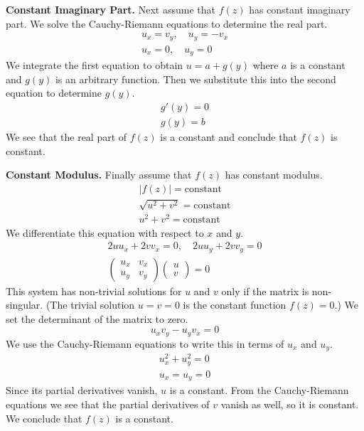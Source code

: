 {\begin{Solution}
  \textbf{Constant Imaginary Part.}
  Next assume that $f(z)$ has constant imaginary part.  We solve the 
  Cauchy-Riemann equations to determine the real part.
  \begin{gather*}
    u_x = v_y, \quad u_y = - v_x
    \\
    u_x = 0, \quad u_y = 0
  \end{gather*}
  We integrate the first equation to obtain $u = a + g(y)$ where $a$ is a 
  constant and $g(y)$ is an arbitrary function.  Then we substitute this 
  into the second equation to determine $g(y)$.
  \begin{gather*}
    g'(y) = 0
    \\
    g(y) = b
  \end{gather*}
  We see that the real part of $f(z)$ is a constant and conclude 
  that $f(z)$ is constant.


  \textbf{Constant Modulus.}
  Finally assume that $f(z)$ has constant modulus.  
  \begin{gather*}
    |f(z)| = \mathrm{constant}
    \\
    \sqrt{u^2 + v^2} = \mathrm{constant}
    \\
    u^2 + v^2 = \mathrm{constant}
  \end{gather*}
  We differentiate this equation with respect to $x$ and $y$.
  \begin{gather*}
    2 u u_x + 2 v v_x = 0, \quad 2 u u_y + 2 v v_y = 0
    \\  
    \begin{pmatrix}
      u_x & v_x \\
      u_y & v_y
    \end{pmatrix}
    \begin{pmatrix}
      u \\
      v
    \end{pmatrix}
    = 0
  \end{gather*}
  This system has non-trivial solutions for $u$ and $v$ only if the matrix
  is non-singular.  (The trivial solution $u = v = 0$ is the constant function
  $f(z) = 0$.)  We set the determinant of the matrix to zero.
  \[
  u_x v_y - u_y v_x = 0
  \]
  We use the Cauchy-Riemann equations to write this in terms of $u_x$ and $u_y$.
  \begin{gather*}
    u_x^2 + u_y^2 = 0
    \\
    u_x = u_y = 0
  \end{gather*}
  Since its partial derivatives vanish, $u$ is a constant.  
  From the Cauchy-Riemann equations we see
  that the partial derivatives of $v$ vanish as well, so it is constant.
  We conclude that $f(z)$ is a constant.



\end{Solution}}
